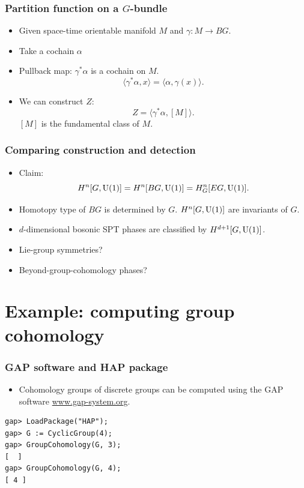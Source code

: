 \documentclass[xcolor=table, aspectratio=43,ignorenonframetext]{beamer}
\newcommand{\uone}{\text U(1)}
\begin{document}
\begin{frame}
	\frametitle{Partition function on a $G$-bundle}
	\begin{itemize}
		\item Given space-time orientable manifold $M$ and $\gamma:M\rightarrow BG$.
		\item Take a cochain $\alpha$
		\item Pullback map: $\gamma^\ast\alpha$ is a cochain on $M$.
		\[\langle \gamma^\ast\alpha, x\rangle = \langle \alpha,\gamma(x)\rangle.\]
		\item We can construct $Z$:
		\[Z = \langle\gamma^\ast\alpha, [M]\rangle.\]
		$[M]$ is the fundamental class of $M$.
	\end{itemize}
\end{frame}

\begin{frame}
	\frametitle{Comparing construction and detection}
	\begin{itemize}
		\item Claim:
		\[H^n[G, \uone] = H^n[BG, \uone] = H^n_G[EG, \uone].\]
		\item Homotopy type of $BG$ is determined by $G$. $H^n[G, \uone]$ are invariants of $G$.
		\item $d$-dimensional bosonic SPT phases are classified by
		$H^{d+1}[G, \uone]$.
		\item Lie-group symmetries?
		\item Beyond-group-cohomology phases?
	\end{itemize}
\end{frame}

\section{Example: computing group cohomology}

\begin{frame}[fragile]
	\frametitle{GAP software and HAP package}
	\begin{itemize}
		\item Cohomology groups of discrete groups can be computed using the GAP software \url{www.gap-system.org}.
	\end{itemize}
	\begin{verbatim}
gap> LoadPackage("HAP");
gap> G := CyclicGroup(4);
gap> GroupCohomology(G, 3);
[  ]
gap> GroupCohomology(G, 4);
[ 4 ]
	\end{verbatim}
\end{frame}
\end{document}
